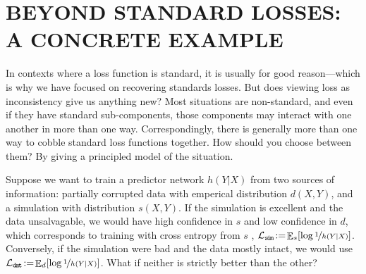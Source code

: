 \documentclass[twoside]{article}
\theoremstyle{plain}
\theoremstyle{definition}
\DeclareMathOperator*{\Ex}{\mathbb{E}} %
\begin{document}
\section{BEYOND STANDARD LOSSES: A CONCRETE EXAMPLE}
%
In contexts where a loss function is standard, it is usually for good reason---which is why we have focused on recovering standards losses.
But does viewing loss as inconsistency give us anything new?
Most situations are non-standard, and even if they have standard sub-components, those components may interact with one another in more than one way. 
Correspondingly, there is generally more than one way to cobble standard loss functions together. 
How should you choose between them? 
By giving a principled model of the situation. 

\def\simsymb{\texttt{s\kern-1.1pti\kern-0.8ptm}}
\def\datsymb{\texttt{d\kern-0.75pta\kern-1ptt}}
\def\ssymb{\texttt{s}}
\def\dsymb{\texttt{d}}
Suppose we want to train a predictor network $h(Y|X)$ from two sources of information: partially corrupted data with emperical distribution $d(X,Y)$, and a simulation with distribution $s(X,Y)$.
If the simulation is excellent and the data unsalvagable, we would have high confidence in $s$ and low confidence in $d$, which corresponds to training with cross entropy from $s$%
, $\mathcal L_{\simsymb}\!:=\!\Ex_s [\log \nf1{h(Y|X)}]$.
Conversely, if the simulation were bad and the data mostly intact, we would use
$\mathcal L_{\datsymb}\!:=\!\Ex_d [\log \nf1{h(Y|X)}]$.
What if neither is strictly better than the other?
\end{document}
